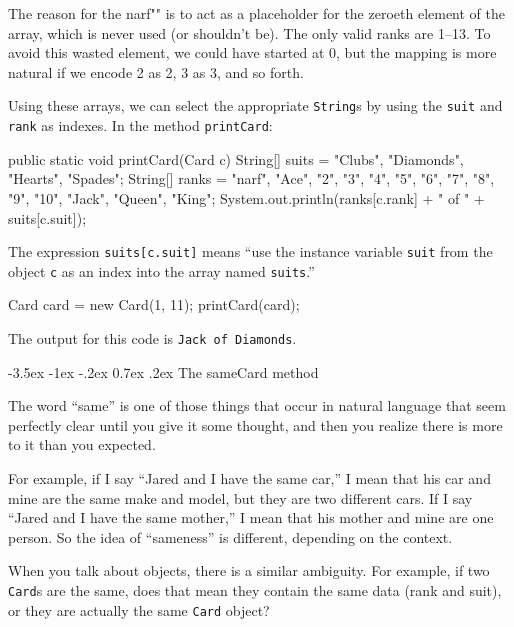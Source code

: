 \documentclass[12pt]{book}
\makeatletter
\theoremstyle{exercise}
\newcommand{\java}[1]{\verb"#1"}
\renewcommand{\section}{\@startsection {section}{1}{\z@}%
    {-3.5ex \@plus -1ex \@minus -.2ex}%
    {0.7ex \@plus.2ex}%
    {\normalfont\Large\bfseries}}
\newcommand{\java}[1]{\lstinline{#1}} %
\makeatother
\begin{document}
The reason for the \java{"narf"} is to act as a placeholder for the zeroeth element of the array, which is never used (or shouldn't be).
The only valid ranks are 1--13.
To avoid this wasted element, we could have started at 0, but the mapping is more natural if we encode 2 as 2, 3 as 3, and so forth.

Using these arrays, we can select the appropriate \java{String}s by using the \java{suit} and \java{rank} as indexes.
In the method \java{printCard}:

\begin{code}
public static void printCard(Card c) {
    String[] suits = {"Clubs", "Diamonds", "Hearts", "Spades"};
    String[] ranks = {"narf", "Ace", "2", "3", "4", "5", "6",
               "7", "8", "9", "10", "Jack", "Queen", "King"};
    System.out.println(ranks[c.rank] + " of " + suits[c.suit]);
}
\end{code}

The expression \java{suits[c.suit]} means ``use the instance variable \java{suit} from the object \java{c} as an index into the array named \java{suits}.''

\begin{code}
    Card card = new Card(1, 11);
    printCard(card);
\end{code}

The output for this code is {\tt Jack of Diamonds}.


\section{The sameCard method}
\label{equivalence}

The word ``same'' is one of those things that occur in natural language that seem perfectly clear until you give it some thought, and then you realize there is more to it than you expected.


For example, if I say ``Jared and I have the same car,'' I mean that his car and mine are the same make and model, but they are
two different cars.
If I say ``Jared and I have the same mother,'' I mean that his mother and mine are one person.
So the idea of ``sameness'' is different, depending on the context.


When you talk about objects, there is a similar ambiguity.
For example, if two \java{Card}s are the same, does that mean they contain the same data (rank and suit), or they are actually
the same \java{Card} object?
\end{document}
